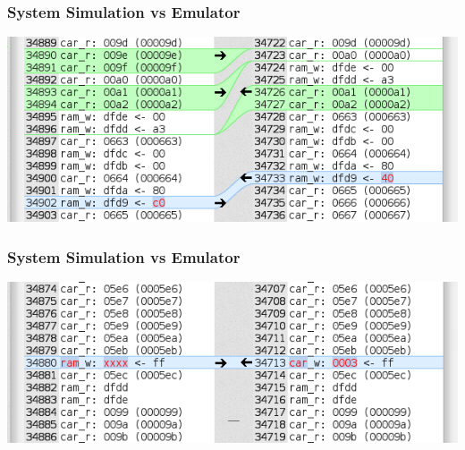 \documentclass[xcolor=table]{beamer}
\begin{document}
\begin{frame}
    \frametitle{System Simulation vs Emulator}
    \includegraphics[width=\textwidth]{../images/diff_bad.png}
\end{frame}

\begin{frame}
    \frametitle{System Simulation vs Emulator}
    \includegraphics[width=\textwidth]{../images/diff_x.png}
\end{frame}
\end{document}
